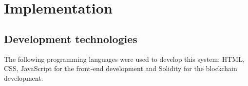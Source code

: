 \chapter{Implementation}

\section{Development technologies}
The following programming languages were used to develop this system: HTML, CSS, JavaScript for the front-end development and Solidity for the blockchain development.